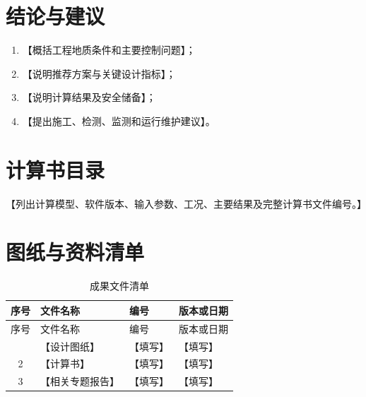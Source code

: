 \documentclass[UTF8,zihao=-4,oneside]{ctexrep}
\newcommand{\placeholder}[1]{\textcolor{documentblack}{【#1】}}
\begin{document}
\chapter{结论与建议}

\begin{enumerate}
  \item \placeholder{概括工程地质条件和主要控制问题}；
  \item \placeholder{说明推荐方案与关键设计指标}；
  \item \placeholder{说明计算结果及安全储备}；
  \item \placeholder{提出施工、检测、监测和运行维护建议}。
\end{enumerate}

\printbibliography[heading=bibintoc,title={参考文献}]

\appendix
\chapter{计算书目录}
\placeholder{列出计算模型、软件版本、输入参数、工况、主要结果及完整计算书文件编号。}

\chapter{图纸与资料清单}
\begin{longtable}{cp{45mm}p{35mm}p{35mm}}
  \caption{成果文件清单}\\
  \toprule
  序号 & 文件名称 & 编号 & 版本或日期 \\
  \midrule
  \endfirsthead
  \toprule
  序号 & 文件名称 & 编号 & 版本或日期 \\
  \midrule
  \endhead
  \bottomrule
  \endfoot
  1 & \placeholder{设计图纸} & \placeholder{填写} & \placeholder{填写} \\
  2 & \placeholder{计算书} & \placeholder{填写} & \placeholder{填写} \\
  3 & \placeholder{相关专题报告} & \placeholder{填写} & \placeholder{填写} \\
\end{longtable}
\end{document}
